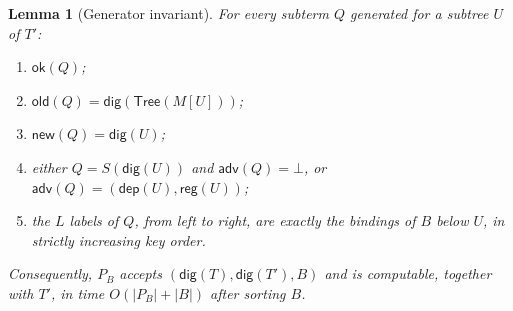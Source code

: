 \documentclass[11pt]{article}
\newtheorem{lemma}{Lemma}
\begin{document}
\begin{lemma}[Generator invariant]
\label{lem:generator}
For every subterm $Q$ generated for a subtree $U$ of $T'$:
\begin{enumerate}[nosep,label=(\roman*)]
  \item $\mathsf{ok}(Q)$;
  \item $\mathsf{old}(Q)=\mathsf{dig}(\mathsf{Tree}(M[U]))$;
  \item $\mathsf{new}(Q)=\mathsf{dig}(U)$;
  \item either $Q=S(\mathsf{dig}(U))$ and $\mathsf{adv}(Q)=\bot$, or $\mathsf{adv}(Q)=(\mathsf{dep}(U),\mathsf{reg}(U))$;
  \item the $L$ labels of $Q$, from left to right, are exactly the bindings of $B$ below $U$, in strictly increasing key order.
\end{enumerate}
Consequently, $P_B$ accepts $(\mathsf{dig}(T),\mathsf{dig}(T'),B)$ and is computable, together with $T'$, in time $O(|P_B|+|B|)$ after sorting $B$.
\end{lemma}
\end{document}
